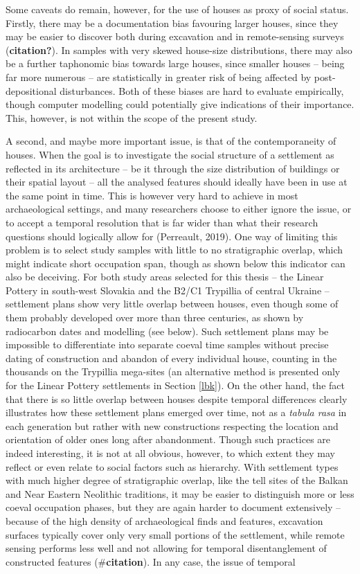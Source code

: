 \documentclass[
  12pt,
]{book}
\begin{document}
Some caveats do remain, however, for the use of houses as proxy of social status. Firstly, there may be a documentation bias favouring larger houses, since they may be easier to discover both during excavation and in remote-sensing surveys (\textbf{citation?}). In samples with very skewed house-size distributions, there may also be a further taphonomic bias towards large houses, since smaller houses -- being far more numerous -- are statistically in greater risk of being affected by post-depositional disturbances. Both of these biases are hard to evaluate empirically, though computer modelling could potentially give indications of their importance. This, however, is not within the scope of the present study.

A second, and maybe more important issue, is that of the contemporaneity of houses. When the goal is to investigate the social structure of a settlement as reflected in its architecture -- be it through the size distribution of buildings or their spatial layout -- all the analysed features should ideally have been in use at the same point in time. This is however very hard to achieve in most archaeological settings, and many researchers choose to either ignore the issue, or to accept a temporal resolution that is far wider than what their research questions should logically allow for (Perreault, 2019). One way of limiting this problem is to select study samples with little to no stratigraphic overlap, which might indicate short occupation span, though as shown below this indicator can also be deceiving. For both study areas selected for this thesis -- the Linear Pottery in south-west Slovakia and the B2/C1 Trypillia of central Ukraine -- settlement plans show very little overlap between houses, even though some of them probably developed over more than three centuries, as shown by radiocarbon dates and modelling (see below). Such settlement plans may be impossible to differentiate into separate coeval time samples without precise dating of construction and abandon of every individual house, counting in the thousands on the Trypillia mega-sites (an alternative method is presented only for the Linear Pottery settlements in Section \ref{lbk}). On the other hand, the fact that there is so little overlap between houses despite temporal differences clearly illustrates how these settlement plans emerged over time, not as a \emph{tabula rasa} in each generation but rather with new constructions respecting the location and orientation of older ones long after abandonment. Though such practices are indeed interesting, it is not at all obvious, however, to which extent they may reflect or even relate to social factors such as hierarchy. With settlement types with much higher degree of stratigraphic overlap, like the tell sites of the Balkan and Near Eastern Neolithic traditions, it may be easier to distinguish more or less coeval occupation phases, but they are again harder to document extensively -- because of the high density of archaeological finds and features, excavation surfaces typically cover only very small portions of the settlement, while remote sensing performs less well and not allowing for temporal disentanglement of constructed features (\#\textbf{citation}). In any case, the issue of temporal 
\end{document}
